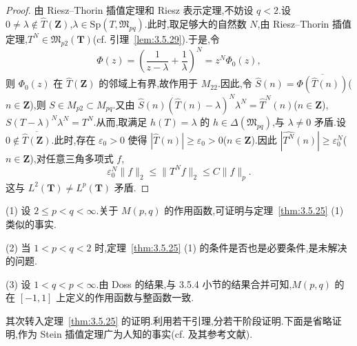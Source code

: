 \begin{proof}
由 Riesz--Thorin 插值定理和 Riesz 表示定理,不妨设 $q < 2$.设 $0 \neq \lambda \notin \widehat{T}(\mathbf{Z})$,$\lambda \in \mathrm{Sp}(T, \mathfrak{M}_{pq})$.此时,取足够大的自然数 $N$,由 Riesz--Thorin 插值定理,$T^{N} \in \mathfrak{M}_{p2}(\mathbf{T})$(cf. 引理~\ref{lem:3.5.29}).于是,令
\begin{equation*}
\Phi(z) = \left(\frac{1}{z - \lambda} + \frac{1}{\lambda}\right)^{N} = z^{N}\Phi_{0}(z),
\end{equation*}
则 $\Phi_{0}(z)$ 在 $\widehat{T}(\mathbf{Z})$ 的邻域上有界,故作用于 $M_{22}$.因此,令 $\widehat{S}(n)=\overline{\Phi(\widehat{T}(n))}$($n\in\mathbf{Z}$),则 $S\in M_{p2}\subset M_{pq}$.又由 $\widehat{S}(n)(\widehat{T}(n)-\lambda)^{N}\lambda^{N}=\widehat{T}^{N}(n)$($n\in\mathbf{Z}$),$S(T-\lambda)^{N}\lambda^{N}=T^{N}$.从而,取满足 $h(T)=\lambda$ 的 $h\in\Delta(\mathfrak{M}_{pq})$,与 $\lambda\neq0$ 矛盾.设 $0\notin\overline{\widehat{T}(\mathbf{Z})}$.此时,存在 $\varepsilon_{0}>0$ 使得 $\left|\widehat{T}(n)\right|\geq\varepsilon_{0}>0$($n\in\mathbf{Z}$).因此 $\left|\widehat{T^{N}}(n)\right|\geq\varepsilon_{0}^{N}$($n\in\mathbf{Z}$),对任意三角多项式 $f$,
\begin{equation*}
\varepsilon_{0}^{N}\|f\|_{2} \leq \|T^{N}f\|_{2} \leq C\|f\|_{p}.
\end{equation*}
这与 $L^{2}(\mathbf{T})\neq L^{p}(\mathbf{T})$ 矛盾.
\end{proof}

\begin{note}\label{note:3.5.27}
(1) 设 $2 \leq p < q < \infty$.关于 $M(p, q)$ 的作用函数,可证明与定理~\ref{thm:3.5.25} (1) 类似的事实.

(2) 当 $1 < p < q < 2$ 时,定理~\ref{thm:3.5.25} (1) 的条件是否也是必要条件,是未解决的问题.

(3) 设 $1 < q < p < \infty$.由 Doss \cite{ch3:16} 的结果,与 3.5.4 小节的结果合并可知,$M(p, q)$ 的在 $[-1, 1]$ 上定义的作用函数与整函数一致.
\end{note}

其次转入定理~\ref{thm:3.5.25} 的证明.利用若干引理,分若干阶段证明.下面是省略证明,作为 Stein 插值定理广为人知的事实(cf. \cite{ch3:4} 及其参考文献).

